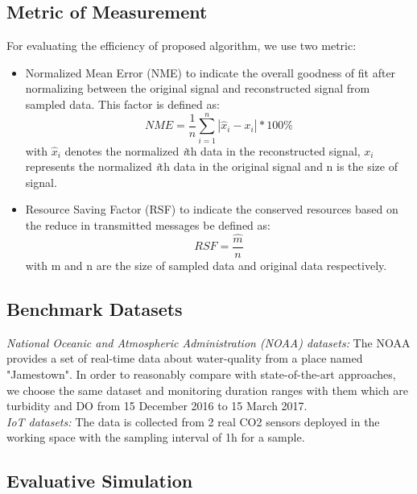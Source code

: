 \subsection{Metric of Measurement}
For evaluating the efficiency of proposed algorithm, we use two metric:
\begin{itemize}
\item Normalized Mean Error (NME) to indicate the overall goodness of fit after normalizing between the original signal and reconstructed signal from sampled data. This factor is defined as:
\begin{equation}\label{NME}
NME = \frac{1}{n}\sum_{i=1}^{n} |\hat{x}_i - x_i | * 100\%
\end{equation}
with $ \hat{x}_i $ denotes the normalized \textit{i}th data in the reconstructed signal, $ x_i $ represents the normalized \textit{i}th data in the original signal and n is the size of signal.
\item Resource Saving Factor (RSF) to indicate the conserved resources based on the reduce in transmitted messages be defined as: 
\begin{equation}\label{RSF}
RSF = \frac{\hat{m}}{n}
\end{equation}
with m and n are the size of sampled data and original data respectively.
\end{itemize}
  
\subsection{Benchmark Datasets}
\textit{National Oceanic and Atmospheric Administration (NOAA) datasets: } The NOAA provides a set of real-time data about water-quality from a place named "Jamestown". In order to reasonably compare with state-of-the-art approaches, we choose the same dataset and monitoring duration ranges with them which are turbidity and DO from 15 December 2016 to 15 March 2017. \\

\textit{IoT datasets: } The data is collected from 2 real CO2 sensors deployed in the working space with the sampling interval of 1h for a sample. 

\subsection{Evaluative Simulation}

